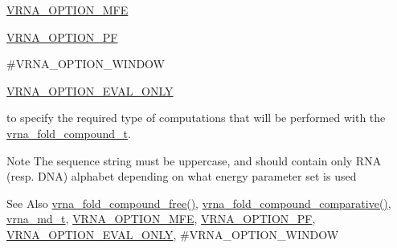 \begin{DoxyItemize}
\item \hyperlink{group__fold__compound_gae63be9127fe7dcc1f9bb14f5bb1064ee}{V\-R\-N\-A\-\_\-\-O\-P\-T\-I\-O\-N\-\_\-\-M\-F\-E}
\item \hyperlink{group__fold__compound_gabfbadcddda3e74ce7f49035ef8f058f7}{V\-R\-N\-A\-\_\-\-O\-P\-T\-I\-O\-N\-\_\-\-P\-F}
\item \#\-V\-R\-N\-A\-\_\-\-O\-P\-T\-I\-O\-N\-\_\-\-W\-I\-N\-D\-O\-W
\item \hyperlink{group__fold__compound_ga61469c423131552c8483229f8b6c7e0e}{V\-R\-N\-A\-\_\-\-O\-P\-T\-I\-O\-N\-\_\-\-E\-V\-A\-L\-\_\-\-O\-N\-L\-Y}
\end{DoxyItemize}

to specify the required type of computations that will be performed with the \hyperlink{group__fold__compound_ga1b0cef17fd40466cef5968eaeeff6166}{vrna\-\_\-fold\-\_\-compound\-\_\-t}.

\begin{DoxyNote}{Note}
The sequence string must be uppercase, and should contain only R\-N\-A (resp. D\-N\-A) alphabet depending on what energy parameter set is used
\end{DoxyNote}
\begin{DoxySeeAlso}{See Also}
\hyperlink{group__fold__compound_gadded6039d63f5d6509836e20321534ad}{vrna\-\_\-fold\-\_\-compound\-\_\-free()}, \hyperlink{group__fold__compound_gad6bacc816af274922b13d947f708aa0c}{vrna\-\_\-fold\-\_\-compound\-\_\-comparative()}, \hyperlink{group__model__details_ga1f8a10e12a0a1915f2a4eff0b28ea17c}{vrna\-\_\-md\-\_\-t}, \hyperlink{group__fold__compound_gae63be9127fe7dcc1f9bb14f5bb1064ee}{V\-R\-N\-A\-\_\-\-O\-P\-T\-I\-O\-N\-\_\-\-M\-F\-E}, \hyperlink{group__fold__compound_gabfbadcddda3e74ce7f49035ef8f058f7}{V\-R\-N\-A\-\_\-\-O\-P\-T\-I\-O\-N\-\_\-\-P\-F}, \hyperlink{group__fold__compound_ga61469c423131552c8483229f8b6c7e0e}{V\-R\-N\-A\-\_\-\-O\-P\-T\-I\-O\-N\-\_\-\-E\-V\-A\-L\-\_\-\-O\-N\-L\-Y}, \#\-V\-R\-N\-A\-\_\-\-O\-P\-T\-I\-O\-N\-\_\-\-W\-I\-N\-D\-O\-W
\end{DoxySeeAlso}

